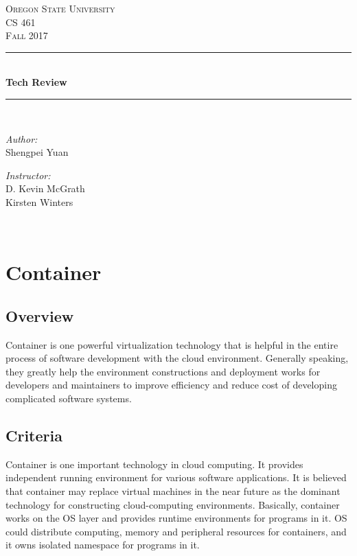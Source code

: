 \documentclass[letterpaper,10pt]{article}
\begin{document}
    \begin{titlepage}
    \newcommand{\HRule}{\rule{\linewidth}{0.5mm}}
    \center
    \textsc{\Large Oregon State University}\\[1.5cm]
    \textsc{\Large CS 461}\\[0.5cm]
    \textsc{\Large Fall 2017}\\[0.5cm]
    \HRule \\[0.4cm]
    { \huge \bfseries Tech Review}\\[0.4cm] %
    \HRule \\[1.5cm]
    \begin{minipage}{0.4\textwidth}
        \begin{flushleft} \large
        \emph{Author:}\\
        Shengpei Yuan
        \end{flushleft}
    \end{minipage}
    \begin{minipage}{0.4\textwidth}
        \begin{flushright} \large
        \emph{Instructor:} \\
        D. Kevin McGrath\\
        Kirsten Winters
        \end{flushright}
    \end{minipage}\\[2cm]
    \begin{abstract}
    \item

    \end{abstract}
    \vfill %
    \end{titlepage}

\section{Container}
	\subsection{Overview}
  Container is one powerful virtualization technology that is helpful in the entire process of software development with the cloud environment. Generally speaking, they greatly help the environment constructions and deployment works for developers and maintainers to improve efficiency and reduce cost of developing complicated software systems.

	\subsection{Criteria}
  Container is one important technology in cloud computing. It provides independent running environment for various software applications. It is believed that container may replace virtual machines in the near future as the dominant technology for constructing cloud-computing environments. Basically, container works on the OS layer and provides runtime environments for programs in it. OS could distribute computing, memory and peripheral resources for containers, and it owns isolated namespace for programs in it.
\end{document}
